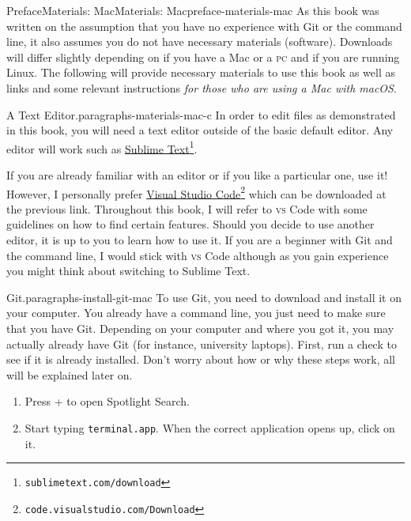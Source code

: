 \documentclass[oneside,10pt,]{book}
\newcommand{\mono}[1]{\texttt{#1}}
\newcommand{\initialism}[1]{\textsc{\MakeLowercase{#1}}}
\newcommand{\kbd}[1]{\keys{{#1}}}
\begin{document}
%
%
\typeout{************************************************}
\typeout{************************************************}
%
\begin{preface}{Preface}{Materials: Mac}{}{Materials: Mac}{}{}{preface-materials-mac}
As this book was written on the assumption that you have no experience with Git or the command line, it also assumes you do not have necessary materials (software). Downloads will differ slightly depending on if you have a Mac or a \initialism{PC} and if you are running Linux. The following will provide necessary materials to use this book as well as links and some relevant instructions \emph{for those who are using a Mac with macOS}.%
\begin{paragraphs}{A Text Editor.}{paragraphs-materials-mac-c}%
In order to edit files as demonstrated in this book, you will need a text editor outside of the basic default editor. Any editor will work such as \href{https://www.sublimetext.com/download}{Sublime Text}\footnote{\nolinkurl{sublimetext.com/download}\label{fn-materials-mac-c-b-b}}.%
\par
If you are already familiar with an editor or if you like a particular one, use it! However, I personally prefer \href{https:/code.visualstudio.com/Download}{Visual Studio Code}\footnote{\nolinkurl{code.visualstudio.com/Download}\label{fn-materials-mac-c-c-b}} which can be downloaded at the previous link. Throughout this book, I will refer to \initialism{VS} Code with some guidelines on how to find certain features. Should you decide to use another editor, it is up to you to learn how to use it. If you are a beginner with Git and the command line, I would stick with \initialism{VS} Code although as you gain experience you might think about switching to Sublime Text.%
\end{paragraphs}%
\begin{paragraphs}{Git.}{paragraphs-install-git-mac}%
To use Git, you need to download and install it on your computer. You already have a command line, you just need to make sure that you have Git. Depending on your computer and where you got it, you may actually already have Git (for instance, university laptops). First, run a check to see if it is already installed. Don't worry about how or why these steps work, all will be explained later on.%
\begin{enumerate}
\item{}Press \kbd{Command} + \kbd{Space} to open Spotlight Search.%
\item{}Start typing \mono{terminal.app}. When the correct application opens up, click on it.%

\end{enumerate}
\end{paragraphs}
\end{preface}
\end{document}

